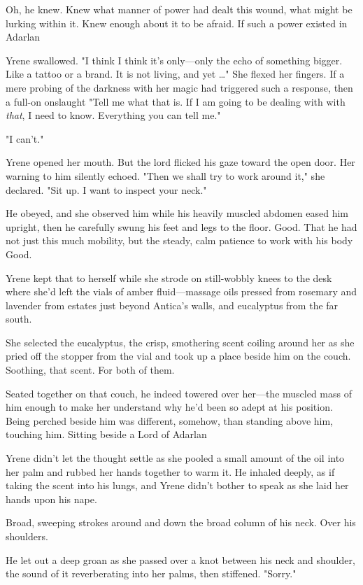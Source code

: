 Oh, he knew. Knew what manner of power had dealt this wound, what might be lurking within it. Knew enough about it to be afraid. If such a power existed in Adarlan 

Yrene swallowed. "I think  I think it's only---only the echo of something bigger. Like a tattoo or a brand. It is not living, and yet
\ldots" She flexed her fingers. If a mere probing of the darkness with her magic had triggered such a response, then a full-on onslaught
 "Tell me what that is. If I am going to be dealing with
 with \emph{that}, I need to know. Everything you can tell me."

"I can't."

Yrene opened her mouth. But the lord flicked his gaze toward the open door. Her warning to him silently echoed. "Then we shall try to work around it," she declared. "Sit up. I want to inspect your neck."

He obeyed, and she observed him while his heavily muscled abdomen eased him upright, then he carefully swung his feet and legs to the floor. Good. That he had not just this much mobility, but the steady, calm patience to work with his body  Good.

Yrene kept that to herself while she strode on still-wobbly knees to the desk where she'd left the vials of amber fluid---massage oils pressed from rosemary and lavender from estates just beyond Antica's walls, and eucalyptus from the far south.

She selected the eucalyptus, the crisp, smothering scent coiling around her as she pried off the stopper from the vial and took up a place beside him on the couch. Soothing, that scent. For both of them.

Seated together on that couch, he indeed towered over her---the muscled mass of him enough to make her understand why he'd been so adept at his position. Being perched beside him was different, somehow, than standing above him, touching him. Sitting beside a Lord of Adarlan 

Yrene didn't let the thought settle as she pooled a small amount of the oil into her palm and rubbed her hands together to warm it. He inhaled deeply, as if taking the scent into his lungs, and Yrene didn't bother to speak as she laid her hands upon his nape.

Broad, sweeping strokes around and down the broad column of his neck. Over his shoulders.

He let out a deep groan as she passed over a knot between his neck and shoulder, the sound of it reverberating into her palms, then stiffened. "Sorry."

